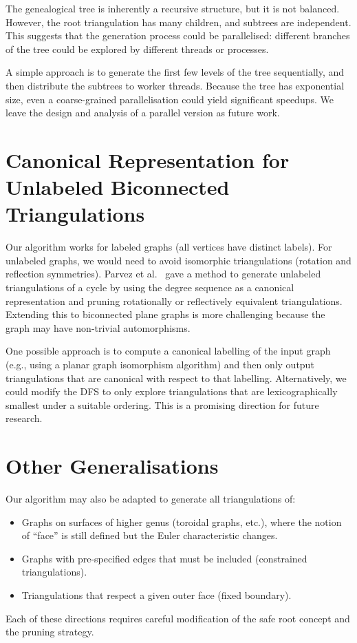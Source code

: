 The genealogical tree is inherently a recursive structure, but it is not balanced. 
However, the root triangulation has many children, and subtrees are independent. 
This suggests that the generation process could be parallelised: different branches of the tree could be explored by different threads or processes.

A simple approach is to generate the first few levels of the tree sequentially, and then distribute the subtrees to worker threads. 
Because the tree has exponential size, even a coarse-grained parallelisation could yield significant speedups. 
We leave the design and analysis of a parallel version as future work.

\section{Canonical Representation for Unlabeled Biconnected Triangulations}
\label{sec:canonical}

Our algorithm works for labeled graphs (all vertices have distinct labels). 
For unlabeled graphs, we would need to avoid isomorphic triangulations (rotation and reflection symmetries). 
Parvez et al.~\cite{parvez2011} gave a method to generate unlabeled triangulations of a cycle by using the degree sequence as a canonical representation and pruning rotationally or reflectively equivalent triangulations. 
Extending this to biconnected plane graphs is more challenging because the graph may have non-trivial automorphisms.

One possible approach is to compute a canonical labelling of the input graph (e.g., using a planar graph isomorphism algorithm) and then only output triangulations that are canonical with respect to that labelling. 
Alternatively, we could modify the DFS to only explore triangulations that are lexicographically smallest under a suitable ordering. 
This is a promising direction for future research.

\section{Other Generalisations}
\label{sec:other_generalisations}

Our algorithm may also be adapted to generate all triangulations of:
\begin{itemize}
    \item Graphs on surfaces of higher genus (toroidal graphs, etc.), where the notion of “face” is still defined but the Euler characteristic changes.
    \item Graphs with pre-specified edges that must be included (constrained triangulations).
    \item Triangulations that respect a given outer face (fixed boundary).
\end{itemize}
Each of these directions requires careful modification of the safe root concept and the pruning strategy.

